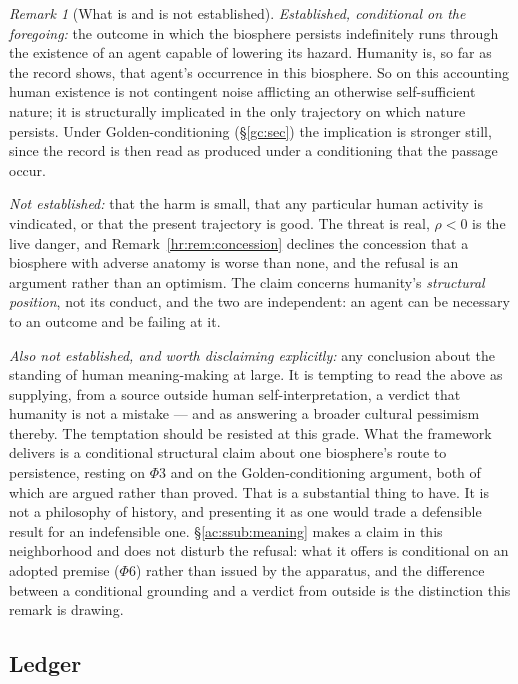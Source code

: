 \documentclass[11pt]{article}
\numberwithin{equation}{section}
\theoremstyle{plain}
\theoremstyle{definition}
\theoremstyle{remark}
\newtheorem{remark}[theorem]{Remark}
\begin{document}
\begin{remark}[What is and is not established]\label{hr:rem:notmistake}
\emph{Established, conditional on the foregoing:} the outcome in which
the biosphere persists indefinitely runs through the existence of an
agent capable of lowering its hazard. Humanity is, so far as the record
shows, that agent's occurrence in this biosphere. So on this accounting
human existence is not contingent noise afflicting an otherwise
self-sufficient nature; it is structurally implicated in the only
trajectory on which nature persists. Under Golden-conditioning
(\S\ref{gc:sec}) the implication is stronger still, since the record is
then read as produced under a conditioning that the passage occur.

\emph{Not established:} that the harm is small, that any particular
human activity is vindicated, or that the present trajectory is good.
The threat is real, $\rho<0$ is the live danger, and
Remark~\ref{hr:rem:concession} declines the concession that a biosphere
with adverse anatomy is worse than none, and the refusal is an argument
rather than an optimism. The claim concerns humanity's
\emph{structural position}, not its conduct, and the two are
independent: an agent can be necessary to an outcome and be failing at
it.

\emph{Also not established, and worth disclaiming explicitly:} any
conclusion about the standing of human meaning-making at large. It is
tempting to read the above as supplying, from a source outside human
self-interpretation, a verdict that humanity is not a mistake --- and as
answering a broader cultural pessimism thereby. The temptation should be
resisted at this grade. What the framework delivers is a conditional
structural claim about one biosphere's route to persistence, resting on
$\Phi3$ and on the Golden-conditioning argument, both of which are
argued rather than proved. That is a substantial thing to have. It is
not a philosophy of history, and presenting it as one would trade a
defensible result for an indefensible one. \S\ref{ac:ssub:meaning} makes a
claim in this neighborhood and does not disturb the refusal: what it offers
is conditional on an adopted premise ($\Phi6$) rather than issued by the
apparatus, and the difference between a conditional grounding and a verdict
from outside is the distinction this remark is drawing.
\end{remark}

\subsection{Ledger}\label{hr:sub:ledger}
\end{document}
